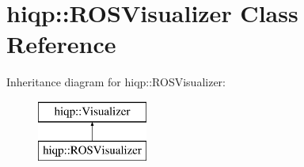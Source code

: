 \hypertarget{classhiqp_1_1ROSVisualizer}{\section{hiqp\-:\-:R\-O\-S\-Visualizer Class Reference}
\label{classhiqp_1_1ROSVisualizer}
}
Inheritance diagram for hiqp\-:\-:R\-O\-S\-Visualizer\-:\begin{figure}[H]
\begin{center}
\leavevmode
\includegraphics[height=2.000000cm]{classhiqp_1_1ROSVisualizer}
\end{center}
\end{figure}
